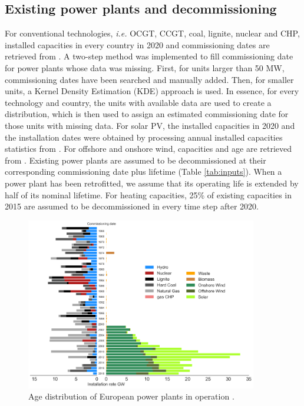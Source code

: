 \documentclass[3p]{elsarticle} %
\begin{document}
\subsection{Existing power plants and decommissioning}

For conventional technologies, \textit{i.e.} OCGT, CCGT, coal, lignite, nuclear and CHP, installed capacities in every country in 2020 and commissioning dates are retrieved from \cite{powerplantmatching}. 
A two-step method was implemented to fill commissioning date for power plants whose data was missing. First, for units larger than 50 MW, commissioning dates have been searched and manually added. Then, for smaller units, a Kernel Density Estimation (KDE) approach is used. In essence, for every technology and country, the units with available data are used to create a distribution, which is then used to assign an estimated commissioning date for those units with missing data. For solar PV, the installed capacities in 2020 and the installation dates were obtained by processing annual installed capacities statistics from \cite{IRENA_2019}. For offshore and onshore wind, capacities and age are retrieved from \cite{thewindpower}. Existing power plants are assumed to be decommissioned at their corresponding commissioning date plus lifetime (Table \ref{tab:inputs}). When a power plant has been retrofitted, we assume that its operating life is extended by half of its nominal lifetime. 
For heating capacities, 25\% of existing capacities in 2015 are assumed to be decommissioned in every time step after 2020.
\begin{figure}[!h]
\centering
\includegraphics[width=0.9\textwidth]{figures/age_distribution_existing.png}
\caption{Age distribution of European power plants in operation \cite{powerplantmatching, IRENA_2019}.} 
\end{figure}
\end{document}

